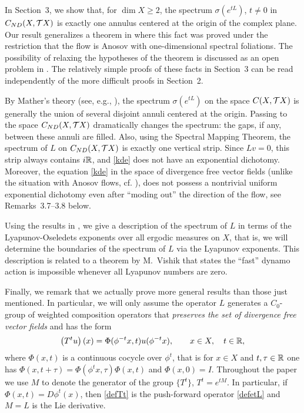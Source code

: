 In Section~3,  we
show that, for $\dim X \geq 2$, the spectrum  $\sigma(e^{tL})$,
$t\neq 0$ in $C_{ND}(X,{{\cal{T}}X})$ is exactly one annulus centered
at the origin of the complex plane.
Our result generalizes a theorem
in \cite{Rafael} where this fact was proved under the restriction
that the flow is Anosov with one-dimensional spectral foliations.
The possibility of relaxing the hypotheses of the theorem is
discussed as an open problem in \cite{Rafael}. The relatively
simple proofs of these facts in Section~3
can be read independently of the
more difficult proofs in Section~2.

By Mather's theory
(see, e.g., \cite{LS,Mather,Pesin}), the
spectrum $\sigma(e^{tL})$ on the space
${C(X,{{\cal{T}}X})}$ is generally the union of several disjoint annuli centered
at the origin. Passing to the space ${C_{ND}(X,{{\cal{T}}X})}$ dramatically changes
the spectrum: the gaps, if any, between these annuli are filled.
Also, using the Spectral Mapping Theorem,
the spectrum of $L$ on
${C_{ND}(X,{{\cal{T}}X})}$ is exactly one
vertical strip. Since $Lv=0$, this strip always
contains $i{\Bbb{R}}$, and \eqref{kde} does not have an exponential
dichotomy. Moreover,  the equation \eqref{kde} in the space of
divergence free
vector fields (unlike the situation with Anosov flows, cf.
\cite{Pesin}), does not possess a nontrivial uniform exponential
dichotomy even after ``moding out'' the direction of the flow, see
Remarks~3.7--3.8 below.

Using the results in
\cite{LS}, we give a description of
the spectrum of $L$  in terms of the Lyapunov-Oseledets exponents
over all ergodic
measures on $X$, that is, we will determine
the boundaries of the spectrum of $L$
via the Lyapunov exponents.
This description is related to a theorem by M.~Vishik \cite{Vishik}
that states the ``fast'' dynamo action is
impossible whenever all Lyapunov
numbers are zero.

Finally, we remark that we actually prove more general results than
those just mentioned. In particular, we will only assume the
operator $L$ generates a
$C_0$-group
of weighted composition operators that {\em preserves the set of
divergence free vector fields} and has the form
\begin{equation}\label{defTt}
\left(T^tu\right)(x)=\Phi(\phi^{-t}x,t)u(\phi^{-t}x),
\qquad x\in X,\quad t\in {\Bbb{R}},
\end{equation}
where $\Phi(x,t)$ is a continuous cocycle over $\phi^t$, that is
for $x\in X$ and $t,\tau\in {\Bbb{R}}$ one has
$\Phi(x,t+\tau)=\Phi(\phi^tx,\tau)\Phi(x,t)$ and $\Phi(x,0)=I$.
Throughout the paper we use $M$ to denote the generator of the
group $\{T^t\}$, $T^t=e^{tM}$. In particular, if
$\Phi(x,t)=D\phi^t(x)$, then \eqref{defTt} is the push-forward
operator \eqref{defetL} and $M=L$ is the Lie derivative.

